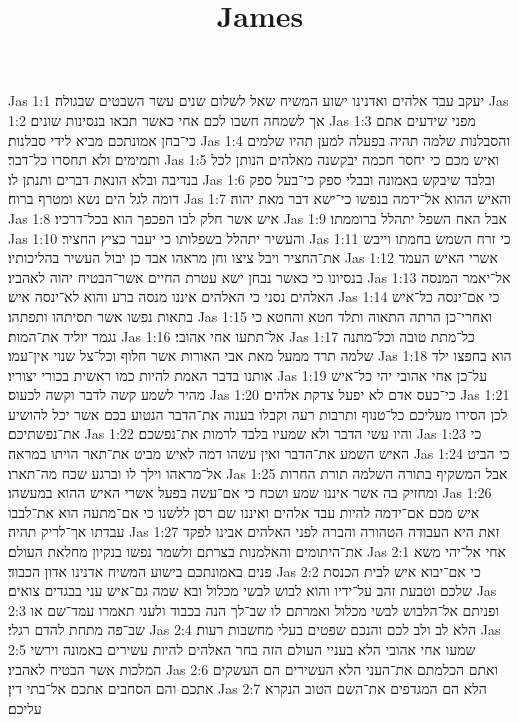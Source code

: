 

\title{James}

Jas 1:1  יעקב עבד אלהים ואדנינו ישוע המשיח שאל לשלום שנים עשר השבטים שבגולה׃
Jas 1:2  אך לשמחה חשבו לכם אחי כאשר תבאו בנסינות שונים׃
Jas 1:3  מפני שידעים אתם כי־בחן אמונתכם מביא לידי סבלנות׃
Jas 1:4  והסבלנות שלמה תהיה בפעלה למען תהיו שלמים ותמימים ולא תחסרו כל־דבר׃
Jas 1:5  ואיש מכם כי יחסר חכמה יבקשנה מאלהים הנותן לכל בנדיבה ובלא הונאת דברים ותנתן לו׃
Jas 1:6  ובלבד שיבקש באמונה ובבלי ספק כי־בעל ספק דומה לגל הים נשא ומטרף ברוח׃
Jas 1:7  והאיש ההוא אל־ידמה בנפשו כי־ישא דבר מאת יהוה׃
Jas 1:8  איש אשר חלק לבו הפכפך הוא בכל־דרכיו׃
Jas 1:9  אבל האח השפל יתהלל ברוממתו׃
Jas 1:10  והעשיר יתהלל בשפלותו כי יעבר כציץ החציר׃
Jas 1:11  כי זרח השמש בחמתו וייבש את־החציר ויבל ציצו וחן מראהו אבד כן יבול העשיר בהליכותיו׃
Jas 1:12  אשרי האיש העמד בנסיונו כי כאשר נבחן ישא עטרת החיים אשר־הבטיח יהוה לאהביו׃
Jas 1:13  אל־יאמר המנסה האלהים נסני כי האלהים איננו מנסה ברע והוא לא־ינסה איש׃
Jas 1:14  כי אם־ינסה כל־איש בתאות נפשו אשר תסיתהו ותפתהו׃
Jas 1:15  ואחרי־כן הרתה התאוה ותלד חטא והחטא כי נגמר יוליד את־המות׃
Jas 1:16  אל־תתעו אחי אהובי׃
Jas 1:17  כל־מתת טובה וכל־מתנה שלמה תרד ממעל מאת אבי האורות אשר חלוף וכל־צל שנוי אין־עמו׃
Jas 1:18  הוא בחפצו ילד אותנו בדבר האמת להיות כמו ראשית בכורי יצוריו׃
Jas 1:19  על־כן אחי אהובי יהי כל־איש מהיר לשמע קשה לדבר וקשה לכעוס׃
Jas 1:20  כי־כעס אדם לא יפעל צדקת אלהים׃
Jas 1:21  לכן הסירו מעליכם כל־טנוף ותרבות רעה וקבלו בענוה את־הדבר הנטוע בכם אשר יכל להושיע את־נפשתיכם׃
Jas 1:22  והיו עשי הדבר ולא שמעיו בלבד לרמות את־נפשכם׃
Jas 1:23  כי האיש השמע את־הדבר ואין עשהו דמה לאיש מביט את־תאר הויתו במראה׃
Jas 1:24  כי הביט אל־מראהו וילך לו וברגע שכח מה־תארו׃
Jas 1:25  אבל המשקיף בתורה השלמה תורת החרות ומחזיק בה אשר איננו שמע ושכח כי אם־עשה בפעל אשרי האיש ההוא במעשהו׃
Jas 1:26  איש מכם אם־ידמה להיות עבד אלהים ואיננו שם רסן ללשנו כי אם־מתעה הוא את־לבבו עבדתו אך־לריק תהיה׃
Jas 1:27  זאת היא העבודה הטהורה והברה לפני האלהים אבינו לפקד את־היתומים והאלמנות בצרתם ולשמר נפשו בנקיון מחלאת העולם׃
Jas 2:1  אחי אל־יהי משא פנים באמונתכם בישוע המשיח אדנינו אדון הכבוד׃
Jas 2:2  כי אם־יבוא איש לבית הכנסת שלכם וטבעת זהב על־ידיו והוא לבוש לבשי מכלול ובא שמה גם־איש עני בבגדים צואים׃
Jas 2:3  ופניתם אל־הלבוש לבשי מכלול ואמרתם לו שב־לך הנה בכבוד ולעני תאמרו עמד־שם או שב־פה מתחת להדם רגלי׃
Jas 2:4  הלא לב ולב לכם והנכם שפטים בעלי מחשבות רעות׃
Jas 2:5  שמעו אחי אהובי הלא בעניי העולם הזה בחר האלהים להיות עשירים באמונה וירשי המלכות אשר הבטיח לאהביו׃
Jas 2:6  ואתם הכלמתם את־העני הלא העשירים הם העשקים אתכם והם הסחבים אתכם אל־בתי דין׃
Jas 2:7  הלא הם המגדפים את־השם הטוב הנקרא עליכם׃
